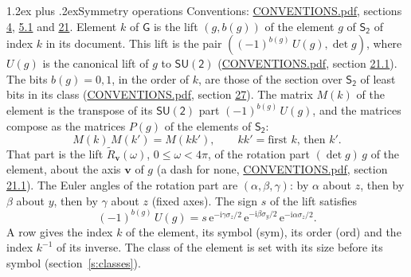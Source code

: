 \documentclass[10pt,a4paper]{article}
\makeatletter
\renewcommand\section{\@startsection{section}{1}{\z@}{-3ex plus -1ex minus -.2ex}%
  {1.2ex plus .2ex}{\normalfont\large\sffamily\bfseries\color{parttitle}}}
\numberwithin{equation}{section}
\newcommand{\grp}[1]{\mathsf{#1}}
\newcommand{\vv}{\mathbf{v}}
\newcommand{\iunit}{\mathrm{i}}
\newcommand{\expe}{\mathrm{e}}
\newcommand{\lift}[1]{\tilde{#1}}
\newcommand{\pauli}[1]{\sigma_{#1}}
\makeatother
\begin{document}
\section{Symmetry operations}\label{s:elements}
Conventions: \href{../../CONVENTIONS.pdf}{CONVENTIONS.pdf}, sections \href{../../../rotation/CONVENTIONS.pdf\#conv.4}{4}, \href{../../../rotation/CONVENTIONS.pdf\#conv.5.1}{5.1} and \href{../../CONVENTIONS.pdf\#conv.21}{21}.
\leavevmode\label{n:index.element}\label{n:element.g}\label{n:function.section}Element $k$ of $\grp{G}$ is the lift $(g, b(g))$ of the element $g$ of \href{../../../rotation/data/pdf/S2.pdf}{$\grp{S_{2}}$} of index $k$ in its document. This lift is the pair $((-1)^{b(g)}\,U(g), \det g)$, where $U(g)$ is the canonical lift of $g$ to $\grp{SU(2)}$ (\href{../../CONVENTIONS.pdf}{CONVENTIONS.pdf}, section \href{../../CONVENTIONS.pdf\#conv.21.1}{21.1}). The bits $b(g) = 0, 1$, in the order of $k$, are those of the section over $\grp{S_{2}}$ of least bits in its class (\href{../../CONVENTIONS.pdf}{CONVENTIONS.pdf}, section \href{../../CONVENTIONS.pdf\#conv.27}{27}). \label{n:matrix.element.pin}\label{n:matrix.element}The matrix $M(k)$ of the element is the transpose of its $\grp{SU(2)}$ part $(-1)^{b(g)}\,U(g)$, and the matrices compose as the matrices $P(g)$ of the elements of $\grp{S_{2}}$:
\begin{equation}\label{e:mprod}M(k)\,M(k') = M(kk'),\qquad kk' = \text{first } k\text{, then } k'.\end{equation}
\leavevmode\label{n:angle.omega}\label{n:vector.axis}That part is the lift $\lift{R}_{\vv}(\omega)$, $0 \le \omega < 4\pi$, of the rotation part $(\det g)\,g$ of the element, about the axis $\vv$ of $g$ (a dash for none, \href{../../CONVENTIONS.pdf}{CONVENTIONS.pdf}, section \href{../../CONVENTIONS.pdf\#conv.21.1}{21.1}). \label{n:angle.euler.alpha}\label{n:angle.euler.beta}\label{n:angle.euler.gamma}\label{n:vector.coordinates}The Euler angles of the rotation part are $(\alpha,\beta,\gamma)$: by $\alpha$ about $z$, then by $\beta$ about $y$, then by $\gamma$ about $z$ (fixed axes). \label{n:local.euler.sign}The sign $s$ of the lift satisfies
\begin{equation}\label{e:euler}(-1)^{b(g)}\,U(g) = s\,\expe^{-\iunit\gamma\pauli{z}/2}\,\expe^{-\iunit\beta\pauli{y}/2}\,\expe^{-\iunit\alpha\pauli{z}/2}.\end{equation}
\leavevmode\label{n:index.element.inverse}\label{n:head.sym}\label{n:head.ord}A row gives the index $k$ of the element, its symbol (sym), its order (ord) and the index $k^{-1}$ of its inverse. \label{n:head.class}The class of the element is set with its size before its symbol (section~\ref{s:classes}).
\end{document}
